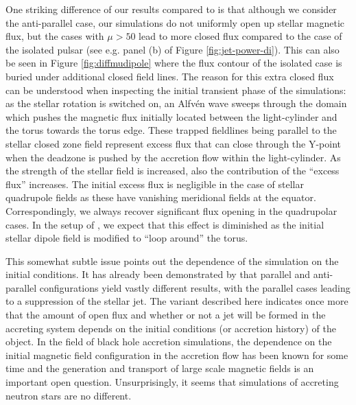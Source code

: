 \documentclass[fleqn,usenatbib]{mnras}
\begin{document}
One striking difference of our results compared to  is that although we consider the anti-parallel case, our simulations do not uniformly open up stellar magnetic flux, but the cases with $\mu>50$ lead to more closed flux compared to the case of the isolated pulsar (see e.g. panel (b) of Figure \ref{fig:jet-power-di}).  This can also be seen in Figure \ref{fig:diffmudipole} where the flux contour of the isolated case is buried under additional closed field lines. 
The reason for this extra closed flux can be understood when inspecting the initial transient phase of the simulations: as the stellar rotation is switched on, an Alfv\'en wave sweeps through the domain which pushes the magnetic flux initially located between the light-cylinder and the torus towards the torus edge. These trapped fieldlines being parallel to the stellar closed zone field represent excess flux that can close through the Y-point when the deadzone is pushed by the accretion flow within the light-cylinder.  As the strength of the stellar field is increased, also the contribution of the ``excess flux'' increases.  The initial excess flux is negligible in the case of stellar quadrupole fields as these have vanishing meridional fields at the equator. Correspondingly, we always recover significant flux opening in the quadrupolar cases. 
In the setup of , we expect that this effect is diminished as the initial stellar dipole field is modified to ``loop around'' the torus.  

This somewhat subtle issue points out the dependence of the simulation on the initial conditions.  It has already been demonstrated by  that parallel and anti-parallel configurations yield vastly different results, with the parallel cases leading to a suppression of the stellar jet.  
The variant described here indicates once more that the amount of open flux and whether or not a jet will be formed in the accreting system depends on the initial conditions (or accretion history) of the object.  
In the field of black hole accretion simulations, the dependence on the initial magnetic field configuration in the accretion flow has been known for some time \citep[see][and references therein]{Komissarov2021} and the generation and transport of large scale magnetic fields is an important open question.  Unsurprisingly, it seems that simulations of accreting neutron stars are no different.  
\end{document}
